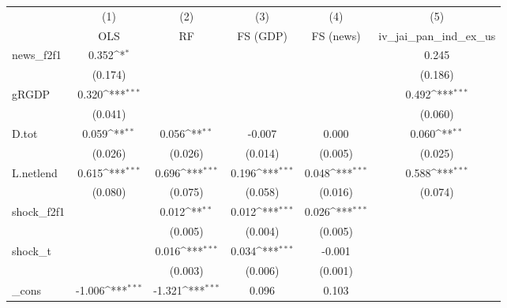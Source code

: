 {
\def\sym#1{\ifmmode^{#1}\else\(^{#1}\)\fi}
\begin{tabular}{l*{5}{c}}
\toprule
            &\multicolumn{1}{c}{(1)}&\multicolumn{1}{c}{(2)}&\multicolumn{1}{c}{(3)}&\multicolumn{1}{c}{(4)}&\multicolumn{1}{c}{(5)}\\
            &\multicolumn{1}{c}{OLS}&\multicolumn{1}{c}{RF}&\multicolumn{1}{c}{FS (GDP)}&\multicolumn{1}{c}{FS (news)}&\multicolumn{1}{c}{iv\_jai\_pan\_ind\_ex\_us}\\
\midrule
news\_f2f1   &       0.352\sym{*}  &                     &                     &                     &       0.245         \\
            &     (0.174)         &                     &                     &                     &     (0.186)         \\
\addlinespace
gRGDP       &       0.320\sym{***}&                     &                     &                     &       0.492\sym{***}\\
            &     (0.041)         &                     &                     &                     &     (0.060)         \\
\addlinespace
D.tot       &       0.059\sym{**} &       0.056\sym{**} &      -0.007         &       0.000         &       0.060\sym{**} \\
            &     (0.026)         &     (0.026)         &     (0.014)         &     (0.005)         &     (0.025)         \\
\addlinespace
L.netlend   &       0.615\sym{***}&       0.696\sym{***}&       0.196\sym{***}&       0.048\sym{***}&       0.588\sym{***}\\
            &     (0.080)         &     (0.075)         &     (0.058)         &     (0.016)         &     (0.074)         \\
\addlinespace
shock\_f2f1  &                     &       0.012\sym{**} &       0.012\sym{***}&       0.026\sym{***}&                     \\
            &                     &     (0.005)         &     (0.004)         &     (0.005)         &                     \\
\addlinespace
shock\_t     &                     &       0.016\sym{***}&       0.034\sym{***}&      -0.001         &                     \\
            &                     &     (0.003)         &     (0.006)         &     (0.001)         &                     \\
\addlinespace
\_cons      &      -1.006\sym{***}&      -1.321\sym{***}&       0.096         &       0.103         &                     \\

\end{tabular}}
